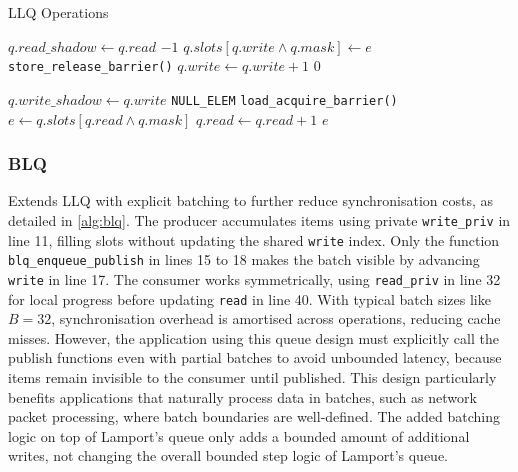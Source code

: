 \begin{algorithm}[!ht]
    \centering
    \captionsetup{justification=centering}
    \caption{\ac{LLQ} Operations \cite{MaffioneCacheAware}}
    \label{alg:llq}
    \scriptsize
    \begin{algorithmic}[1]
             
                \State $q.read\_shadow \gets q.read$ 
                    \State \Return $-1$ 
                \EndIf
            \EndIf
            \State $q.slots[q.write \land q.mask] \gets e$
            \State \texttt{store\_release\_barrier()}
            \State $q.write \gets q.write + 1$
            \State \Return $0$
        \EndFunction
        
        \State
        
             
                \State $q.write\_shadow \gets q.write$ 
                    \State \Return \texttt{NULL\_ELEM}
                \EndIf
            \EndIf
            \State \texttt{load\_acquire\_barrier()}
            \State $e \gets q.slots[q.read \land q.mask]$
            \State $q.read \gets q.read + 1$
            \State \Return $e$
        \EndFunction
    \end{algorithmic}
\end{algorithm}

\subsubsection{\acf{BLQ}}
Extends \ac{LLQ} with explicit batching to further reduce synchronisation costs, as detailed in \cref{alg:blq}. The producer accumulates items using private \texttt{write\_priv} in line 11, filling slots without updating the shared \texttt{write} index. Only the function \texttt{blq\_enqueue\_publish} in lines 15 to 18 makes the batch visible by advancing \texttt{write} in line 17. The consumer works symmetrically, using \texttt{read\_priv} in line 32 for local progress before updating \texttt{read} in line 40. With typical batch sizes like $B = 32$, synchronisation overhead is amortised across operations, reducing cache misses. However, the application using this queue design must explicitly call the publish functions even with partial batches to avoid unbounded latency, because items remain invisible to the consumer until published. This design particularly benefits applications that naturally process data in batches, such as network packet processing, where batch boundaries are well-defined. The added batching logic on top of Lamport's queue only adds a bounded amount of additional writes, not changing the overall bounded step logic of Lamport's queue. \cite{MaffioneCacheAware}

